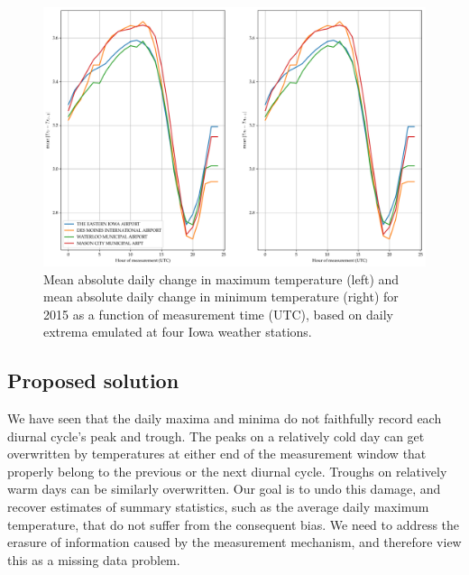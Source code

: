 \documentclass[letter]{article}
\makeatletter
\def\maxwidth{\ifdim\Gin@nat@width>\linewidth\linewidth
\else\Gin@nat@width\fi}
\let\Oldincludegraphics\includegraphics
\renewcommand{\includegraphics}[1]{\Oldincludegraphics[width=.8\maxwidth]{#1}}
\makeatother
\begin{document}
\begin{figure}
\centering
\includegraphics{../figures/waterloo_meanabsdiff.png}
\caption{\label{fig:waterloo_meanabsdiff}
Mean absolute daily change in maximum temperature (left)
and mean absolute daily change in minimum temperature (right)
for 2015 as a function of measurement time (UTC),
based on daily extrema emulated at four Iowa weather stations.}
\end{figure}
    


        \subsection{Proposed solution}\label{proposed-solution}

We have seen that the daily maxima and minima do not faithfully record each diurnal cycle's peak and trough.
The peaks on a relatively cold day can get overwritten by temperatures at either end of the measurement window that properly belong to the previous or the next diurnal cycle.
Troughs on relatively warm days can be similarly overwritten.
Our goal is to undo this damage, and recover estimates of summary statistics, such as the average daily maximum temperature, that do not suffer from the consequent bias.
We need to address the erasure of information caused by the measurement mechanism, and therefore view this as a missing data problem.
\end{document}
